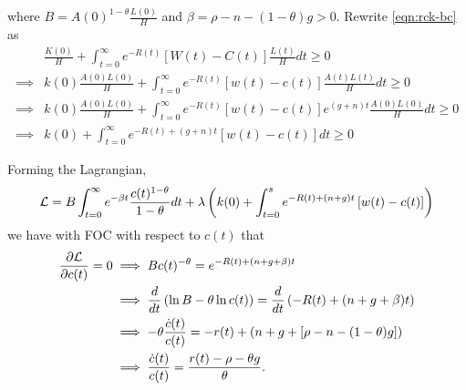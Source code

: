 \documentclass[../main.tex]{subfiles}
\begin{document}
        where $B = A(0)^{1-\theta}\frac{L(0)}{H}$ and $\beta = \rho - n - (1-\theta)g > 0$. Rewrite \eqref{eqn:rck-bc} as 
        \begin{align}
            & \frac{K(0)}{H} + \int_{t=0}^\infty e^{-R(t)} [W(t) - C(t)] \frac{L(t)}{H} dt
            \ge 0
            \\
            \implies&
            k(0)\frac{A(0) L(0)}{H}
            + \int_{t=0}^\infty e^{-R(t)} [w(t) - c(t)] \frac{A(t) L(t)}{H} dt
            \ge 0
            \\
            \implies&
            k(0)\frac{A(0) L(0)}{H}
            + \int_{t=0}^\infty e^{-R(t)} [w(t) - c(t)] e^{(g + n)t}\frac{A(0) L(0)}{H} dt
            \ge 0
            \\
            \implies&
            k(0) + \int_{t=0}^\infty e^{-R(t) + (g + n)t} [w(t) - c(t)] dt
            \ge 0
        \end{align}
        
        Forming the Lagrangian,
        \begin{align}
            \mathcal{L}
            = B \int_{t=0}^\infty e^{-\beta t}
            \frac{c(t)^{1-\theta}}{1-\theta} dt
            + \lambda
            \left(
            k(0) + \int_{t=0}^s e^{-R(t) + (n+g)t} \left[w(t) - c(t)\right]
            \right)
        \end{align}
        we have with FOC with respect to $c(t)$ that
        \begin{align}
            \frac{\partial \mathcal{L}}{\partial c(t)} = 0
            & \implies
            B c(t)^{-\theta} = e^{-R(t) + (n + g + \beta)t}
            \\
            & \implies
            \frac{d}{dt}\left(\ln B -\theta \ln c(t)\right)
            = \frac{d}{dt} \left( -R(t) + (n + g + \beta)t \right)
            \\
            & \implies
            -\theta \frac{\dot c(t)}{c(t)}
            = -r(t) + (n + g + \left[\rho - n - (1-\theta) g\right])
            \\
            & \implies
            \frac{\dot c(t)}{c(t)}
            = \frac{r(t) - \rho - \theta g}{\theta}.
            \label{eqn:consumption-path}
        \end{align}
        
\end{document}
